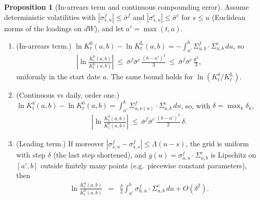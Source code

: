 \documentclass[11pt,english]{amsart}
\theoremstyle{definition}
\newtheorem{prop}{Proposition}
\begin{document}
\begin{prop}[In-arrears term and continuous compounding error]\label{prop:coupon_continuous_error}
Assume deterministic volatilities with $|\sigma^f_{s,u}|\le\bar{\sigma}^f$ and $|\sigma^c_{s,u}|\le\bar{\sigma}^c$ for $s\le u$ (Euclidean norms of the loadings on $dW$), and let $a' = \max(t,a)$.
\begin{enumerate}
\item (In-arrears term.) $\ln K^0_t(a,b) - \ln K^{\mathrm{L}}_t(a,b) = -\int_{a'}^b\Sigma^f_{u,b}\cdot\Sigma^c_{u,b}\,du$, so
\begin{eqnarray*}
  \left|\ln\frac{K^0_t(a,b)}{K^{\mathrm{L}}_t(a,b)}\right| ~\le~ \bar{\sigma}^f\bar{\sigma}^c\,\frac{(b-a')^3}{3} ~\le~ \bar{\sigma}^f\bar{\sigma}^c\,\frac{\theta^3}{3} ,
\end{eqnarray*}
uniformly in the start date $a$. The same bound holds for $\ln(K^\delta_t/K^{\mathrm{L}}_t)$.
\item (Continuous vs daily, order one.) $\ln K^\delta_t(a,b) - \ln K^0_t(a,b) = \int_{a'}^b\Sigma^f_{u,\nu(u)}\cdot\Sigma^c_{u,b}\,du$, so, with $\delta = \max_k\delta_k$,
\begin{eqnarray*}
  \left|\ln\frac{K^\delta_t(a,b)}{K^0_t(a,b)}\right| ~\le~ \bar{\sigma}^f\bar{\sigma}^c\,\frac{(b-a')^2}{2}\,\delta .
\end{eqnarray*}
\item (Leading term.) If moreover $|\sigma^f_{s,u}-\sigma^f_{s,s}|\le\Lambda(u-s)$, the grid is uniform with step $\delta$ (the last step shortened), and $g(u) = \sigma^f_{u,u}\cdot\Sigma^c_{u,b}$ is Lipschitz on $[a',b]$ outside finitely many points (e.g.\ piecewise constant parameters), then
\begin{eqnarray}
  \ln\frac{K^\delta_t(a,b)}{K^0_t(a,b)} &=& \frac{\delta}{2}\int_{a'}^b \sigma^f_{u,u}\cdot\Sigma^c_{u,b}\,du + O(\delta^2) .
  \label{eq:coupon_continuous_leading}
\end{eqnarray}
\end{enumerate}
\end{prop}
\end{document}

